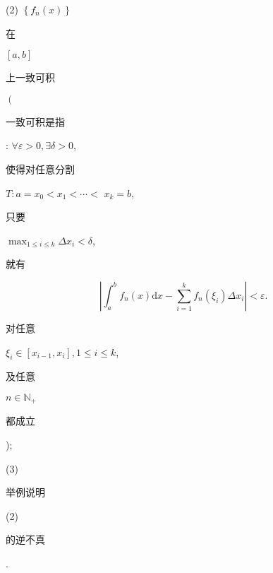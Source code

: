 \documentclass[10pt]{article}
\begin{document}
(2) $\left\{f_{n}(x)\right\}$ \begin{CJK}{UTF8}{mj}在\end{CJK} $[a, b]$ \begin{CJK}{UTF8}{mj}上一致可积\end{CJK} $\left(\right.$ \begin{CJK}{UTF8}{mj}一致可积是指\end{CJK}: $\forall \varepsilon>0, \exists \delta>0$, \begin{CJK}{UTF8}{mj}使得对任意分割\end{CJK} $T: a=x_{0}<x_{1}<\cdots<$ $x_{k}=b$, \begin{CJK}{UTF8}{mj}只要\end{CJK} $\max _{1 \leq i \leq k} \Delta x_{i}<\delta$, \begin{CJK}{UTF8}{mj}就有\end{CJK}
$$
\left|\int_{a}^{b} f_{n}(x) \mathrm{d} x-\sum_{i=1}^{k} f_{n}\left(\xi_{i}\right) \Delta x_{i}\right|<\varepsilon .
$$
\begin{CJK}{UTF8}{mj}对任意\end{CJK} $\xi_{i} \in\left[x_{i-1}, x_{i}\right], 1 \leq i \leq k$, \begin{CJK}{UTF8}{mj}及任意\end{CJK} $n \in \mathbb{N}_{+}$\begin{CJK}{UTF8}{mj}都成立\end{CJK});

(3) \begin{CJK}{UTF8}{mj}举例说明\end{CJK} (2) \begin{CJK}{UTF8}{mj}的逆不真\end{CJK}.
\end{document}

